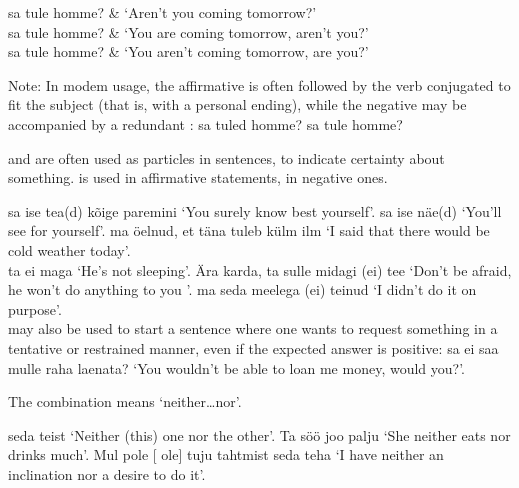 	\twoColumnsTable
	 sa  tule homme?  	& `Aren't you \sing coming tomorrow?'  \\
	 sa tule homme?  		& `You are coming tomorrow, aren't you?'  \\
	 sa tule homme? 			& `You aren't coming tomorrow, are you?'
	\tableEnd

Note: In modem usage, the affirmative  is often followed by the verb conjugated to fit the subject (that is, with a personal ending), while the negative  may be accompanied by a redundant :  sa tuled homme?  sa  tule homme?

\newSection {} and  are often used as  particles in sentences, to indicate certainty about something.  is used in affirmative statements,  in negative ones.

 sa ise tea(d) kõige paremini `You \sing surely know best yourself'.  sa ise näe(d) `You'll see for yourself'.  ma öelnud, et täna tuleb külm ilm `I said that there would be cold weather today'. \\

 ta ei maga `He's not sleeping'. Ära karda,  ta sulle midagi (ei) tee `Don't be afraid, he won't do anything to you \sing'.  ma seda meelega (ei) teinud `I didn't do it on purpose'. \\

 may also be used to start a sentence where one wants to request something in a tentative or restrained manner, even if the expected answer is positive:  sa ei saa mulle raha laenata? `You \sing wouldn't be able to loan me money, would you?'.

\newSection The combination  means `neither\dots nor'.

 seda  teist `Neither (this) one nor the other'. Ta  söö  joo palju `She neither eats nor drinks much'. Mul pole [ ole] tuju  tahtmist seda teha `I have neither an inclination nor a desire to do it'.

\Text %

\Vocabulary %

\Exercises %

\Expressions %

\AnswersToExercises %
